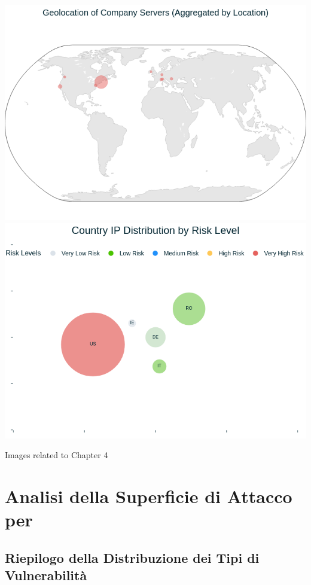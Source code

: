 \begin{center}
\includegraphics[width=\linewidth]{pngs/3_1.png}
\vspace{1cm}\includegraphics[width=\linewidth]{pngs/3_2.png}
\vspace{1cm}\caption{Images related to Chapter 4}
\end{center}
\chapter{Analisi della Superficie di Attacco per}

\section{Riepilogo della Distribuzione dei Tipi di Vulnerabilità}

